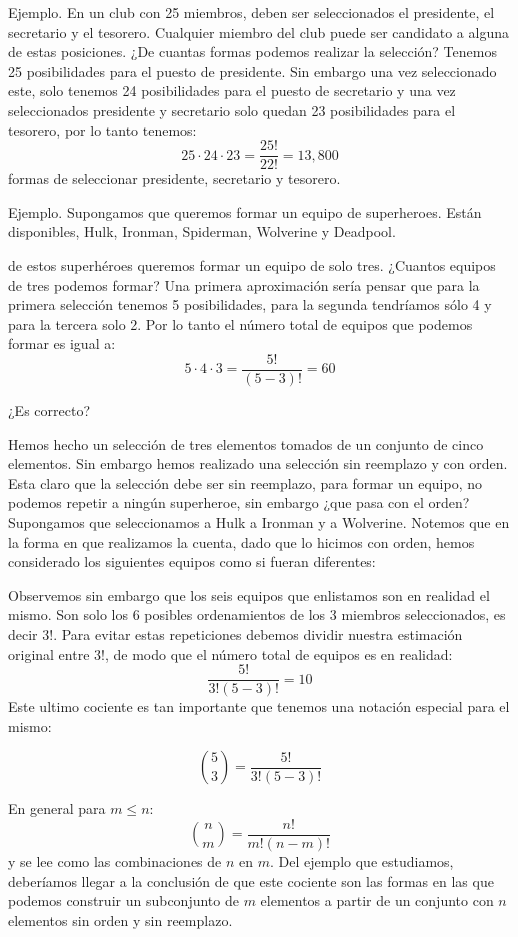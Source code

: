 \documentclass[14pt]{extreport}
\theoremstyle{definicion}
\theoremstyle{propiedad}
\begin{document}
Ejemplo. En un club con 25 miembros, deben ser seleccionados el presidente, el secretario y el tesorero. Cualquier miembro del club puede ser candidato a alguna de estas posiciones. ¿De cuantas formas podemos realizar la selección? Tenemos 25 posibilidades para el puesto de presidente. Sin embargo una vez seleccionado este, solo tenemos 24 posibilidades para el puesto de secretario y una vez seleccionados presidente y secretario solo quedan 23 posibilidades para el tesorero, por lo tanto tenemos:
$$
  25 \cdot 24 \cdot 23 = \frac{25!}{22!} = 13,800
$$
formas de seleccionar presidente, secretario y tesorero.

Ejemplo. Supongamos que queremos formar un equipo de superheroes. Están disponibles, Hulk, Ironman, Spiderman, Wolverine y Deadpool.

de estos superhéroes queremos formar un equipo de solo tres. ¿Cuantos equipos de tres podemos formar? Una primera aproximación sería pensar que para la primera selección tenemos 5 posibilidades, para la segunda tendríamos sólo 4 y para la tercera solo 2. Por lo tanto el número total de equipos que podemos formar es igual a:
$$
  5\cdot4\cdot3=\frac{5!}{(5 - 3)!} = 60
$$

\begin{center}
  ¿Es correcto?
\end{center}

Hemos hecho un selección de tres elementos tomados de un conjunto de cinco elementos. Sin embargo hemos realizado una selección sin reemplazo y con orden. Esta claro que la selección debe ser sin reemplazo, para formar un equipo, no podemos repetir a ningún superheroe, sin embargo ¿que pasa con el orden? Supongamos que seleccionamos a Hulk a Ironman y a Wolverine. Notemos que en la forma en que realizamos la cuenta, dado que lo hicimos con orden, hemos considerado los siguientes equipos como si fueran diferentes:

Observemos sin embargo que los seis equipos que enlistamos son en realidad el mismo. Son solo los 6 posibles ordenamientos de los 3 miembros seleccionados, es decir $3!$. Para evitar estas repeticiones debemos dividir nuestra estimación original entre $3!$, de modo que el número total de equipos es en realidad:
$$
  \frac{5!}{3!(5 - 3)!} = 10
$$
Este ultimo cociente es tan importante que tenemos una notación especial para el mismo:

$$
  \binom{5}{3}= \frac{5!}{3!(5 - 3)!}
$$

En general para $m \leq n$:
$$
  \binom{n}{m}=  \frac{n!}{m!(n - m)!}
$$
y se lee como las combinaciones de $n$ en $m$. Del ejemplo que estudiamos, deberíamos llegar a la conclusión de que este cociente son las formas en las que podemos construir un subconjunto de $m$ elementos a partir de un conjunto con $n$ elementos sin orden y sin reemplazo.
\end{document}

